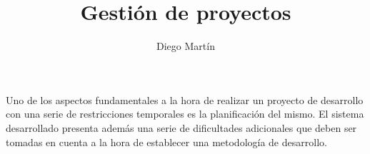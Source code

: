 \documentclass{article}
\begin{document}
\title{Gestión de proyectos}
\author{Diego Martín}
\maketitle

Uno de los aspectos fundamentales a la hora de realizar un proyecto de desarrollo con una serie de restricciones temporales es la planificación del mismo. El sistema desarrollado presenta además una serie de dificultades adicionales que deben ser tomadas en cuenta a la hora de establecer una metodología de desarrollo.

\section{}
\end{document}
